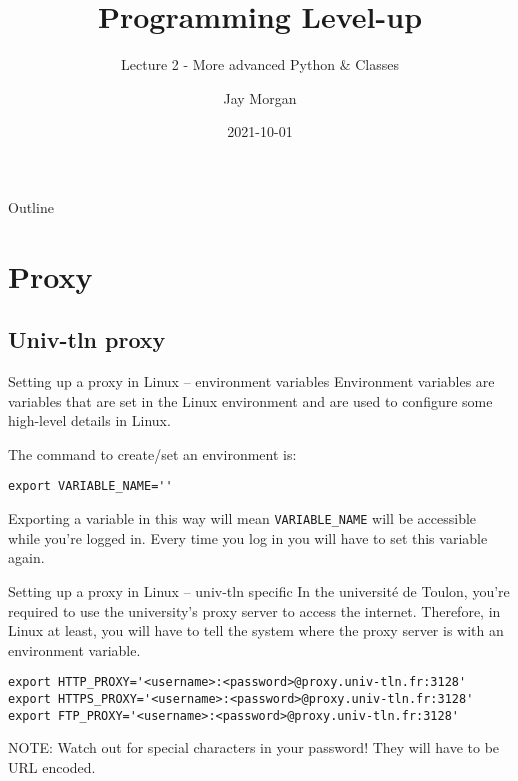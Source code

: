 \documentclass[10pt]{beamer}
\author{Jay Morgan}
\date{2021-10-01}
\title{Programming Level-up}
\subtitle{Lecture 2 - More advanced Python \& Classes}
\begin{document}
\maketitle
\begin{frame}{Outline}
\tableofcontents
\end{frame}


\section{Proxy}
\label{sec:orgbe8cf79}

\subsection{Univ-tln proxy}
\label{sec:orgd1f7480}

\begin{frame}[label={sec:org2001cc4},fragile]{Setting up a proxy in Linux -- environment variables}
 Environment variables are variables that are set in the Linux environment and are
used to configure some high-level details in Linux.

The command to create/set an environment is:

\begin{verbatim}
export VARIABLE_NAME=''
\end{verbatim}

Exporting a variable in this way will mean \texttt{VARIABLE\_NAME} will be accessible while
you're logged in. Every time you log in you will have to set this variable again.
\end{frame}

\begin{frame}[label={sec:org21eb05a},fragile]{Setting up a proxy in Linux -- univ-tln specific}
 In the université de Toulon, you're required to use the university's proxy server to
access the internet. Therefore, in Linux at least, you will have to tell the system
where the proxy server is with an environment variable.

\begin{verbatim}
export HTTP_PROXY='<username>:<password>@proxy.univ-tln.fr:3128'
export HTTPS_PROXY='<username>:<password>@proxy.univ-tln.fr:3128'
export FTP_PROXY='<username>:<password>@proxy.univ-tln.fr:3128'
\end{verbatim}

\alert{NOTE}: Watch out for special characters in your password! They will have to be URL encoded.
\end{frame}
\end{document}
